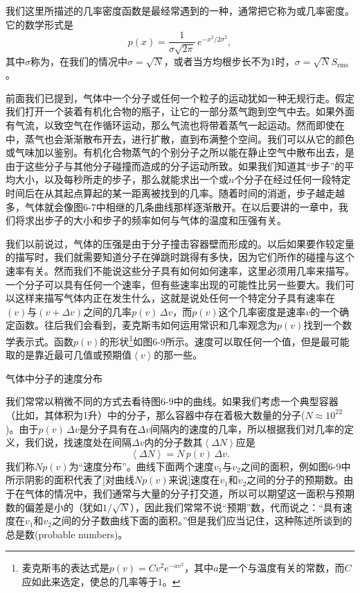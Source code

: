 \documentclass[12pt,oneside]{book}
\begin{document}
我们这里所描述的几率密度函数是最经常遇到的一种，通常把它称为或几率密度。它的数学形式是
\begin{equation}
\label{Eq:I:6:20}
p(x)=\frac{1}{\sigma\sqrt{2\pi}}\,e^{-x^2/2\sigma^2},
\end{equation}
其中$\sigma$称为，在我们的情况中$\sigma=\sqrt{N}$，或者当方均根步长不为1时，$\sigma=\sqrt{N}S_{\text{rms}}$。

前面我们已提到，气体中一个分子或任何一个粒子的运动犹如一种无规行走。假定我们打开一个装着有机化合物的瓶子，让它的一部分蒸气跑到空气中去。如果外面有气流，以致空气在作循环运动，那么气流也将带着蒸气一起运动。然而即使在中，蒸气也会渐渐散布开去，进行扩散，直到布满整个空间。我们可以从它的颜色或气味加以鉴别。有机化合物蒸气的个别分子之所以能在静止空气中散布出去，是由于这些分子与其他分子碰撞而造成的分子运动所致。如果我们知道其“步子”的平均大小，以及每秒所走的步子，那么就能求出一个或$n$个分子在经过任何一段特定时间后在从其起点算起的某一距离被找到的几率。随着时间的消逝，步子越走越多，气体就会像图6-7中相继的几条曲线那样逐渐散开。在以后要讲的一章中，我们将求出步子的大小和步子的频率如何与气体的温度和压强有关。

我们以前说过，气体的压强是由于分子撞击容器壁而形成的。以后如果要作较定量的描写时，我们就需要知道分子在弹跳时跳得有多快，因为它们所作的碰撞与这个速率有关。然而我们不能说这些分子具有如何如何速率，这里必须用几率来描写。一个分子可以具有任何一个速率，但有些速率出现的可能性比另一些要大。我们可以这样来描写气体内正在发生什么，这就是说处任何一个特定分子具有速率在$(v)$与$(v+\Delta v)$之间的几率$p(v)\,\Delta v$，而$p(v)$这个几率密度是速率$v$的一个确定函数。往后我们会看到，麦克斯韦如何运用常识和几率观念为$p(v)$找到一个数学表示式。函数$p(v)$的形状\footnote{麦克斯韦的表达式是$p(v)=Cv^2e^{-av^2}$，其中$a$是一个与温度有关的常数，而$C$应如此来选定，使总的几率等于$1$。}如图6-9所示。速度可以取任何一个值，但是最可能取的是靠近最可几值或预期值$\left < v \right >$的那一些。
\begin{fig}{气体中分子的速度分布}
\caption{气体中分子的速度分布}
\label{fig:气体中分子的速度分布}
\end{fig}

我们常常以稍微不同的方式去看待图6-9中的曲线。如果我们考虑一个典型容器（比如，其体积为1升）中的分子，那么容器中存在着极大数量的分子($N\approx10^{22}$)。由于$p(v)\,\Delta v$是分子具有在$\Delta v$间隔内的速度的几率，所以根据我们对几率的定义，我们说，找速度处在间隔$\Delta v$内的分子数其$\left <\Delta N \right >$应是
\begin{equation}
\label{Eq:I:6:21}
\left <\Delta N\right >=N\,p(v)\,\Delta v.
\end{equation}
我们称$Np(v)$为“速度分布”。曲线下面两个速度$v_1$与$v_2$之间的面积，例如图6-9中所示阴影的面积代表了[对曲线$Np(v)$来说]速度在$v_1$和$v_2$之间的分子的预期数。由于在气体的情况中，我们通常与大量的分子打交道，所以可以期望这一面积与预期数的偏差是小的（犹如$1/\sqrt{N}$），因此我们常常不说“预期”数，代而说之：“具有速度在$v_1$和$v_2$之间的分子数曲线下面的面积。”但是我们应当记住，这种陈述所谈到的总是数(probable numbers)。
\end{document}
